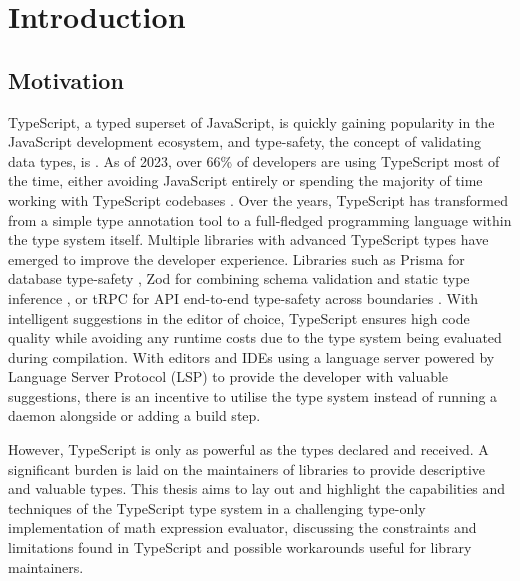 \chapter{Introduction}

\section{Motivation}

TypeScript, a typed superset of JavaScript, is quickly gaining popularity in the JavaScript development ecosystem, and type-safety, the concept of validating data types, is \cite{jsworldconferenceFredSchottTypesafety2023}. As of 2023, over 66\% of developers are using TypeScript most of the time, either avoiding JavaScript entirely or spending the majority of time working with TypeScript codebases \cite{StateJS2022}. Over the years, TypeScript has transformed from a simple type annotation tool to a full-fledged programming language within the type system itself. Multiple libraries with advanced TypeScript types have emerged to improve the developer experience. Libraries such as Prisma for database type-safety \cite{PrismaPrismaNextgeneration}, Zod for combining schema validation and static type inference \cite{mcdonnellZod2023}, or tRPC for API end-to-end type-safety across boundaries \cite{TRPC2023}. With intelligent suggestions in the editor of choice, TypeScript ensures high code quality while avoiding any runtime costs due to the type system being evaluated during compilation. With editors and IDEs using a language server powered by Language Server Protocol (LSP) to provide the developer with valuable suggestions, there is an incentive to utilise the type system instead of running a daemon alongside or adding a build step.

However, TypeScript is only as powerful as the types declared and received. A significant burden is laid on the maintainers of libraries to provide descriptive and valuable types. This thesis aims to lay out and highlight the capabilities and techniques of the TypeScript type system in a challenging type-only implementation of math expression evaluator, discussing the constraints and limitations found in TypeScript and possible workarounds useful for library maintainers.

